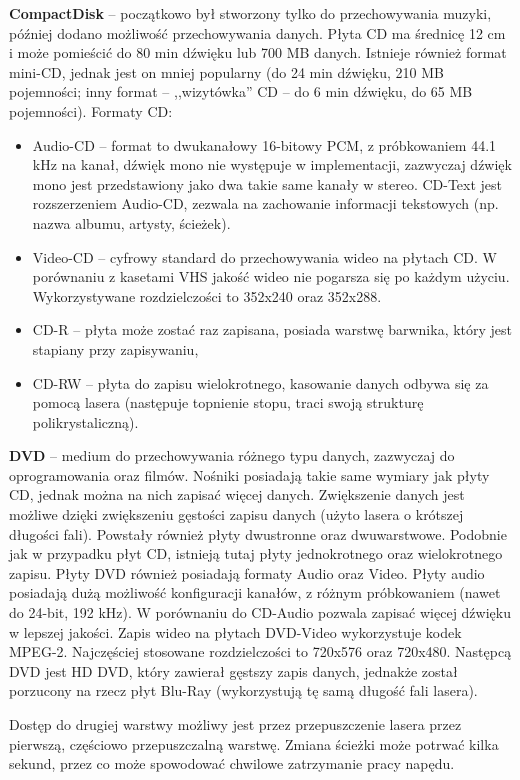 \textbf{CompactDisk} -- początkowo był stworzony tylko do przechowywania muzyki, później dodano możliwość przechowywania danych. Płyta CD ma średnicę 12 cm i może pomieścić do 80 min dźwięku lub 700 MB danych. Istnieje również format mini-CD, jednak jest on mniej popularny (do 24 min dźwięku, 210 MB pojemności; inny format -- ,,wizytówka'' CD -- do 6 min dźwięku, do 65 MB pojemności). Formaty CD:
\begin{itemize}
	\setlength\itemsep{1pt}
	\item Audio-CD -- format to dwukanałowy 16-bitowy PCM, z próbkowaniem 44.1 kHz na kanał, dźwięk mono nie występuje w implementacji, zazwyczaj dźwięk mono jest przedstawiony jako dwa takie same kanały w stereo. CD-Text jest rozszerzeniem Audio-CD, zezwala na zachowanie informacji tekstowych (np. nazwa albumu, artysty, ścieżek).
	\item Video-CD -- cyfrowy standard do przechowywania wideo na płytach CD. W porównaniu z kasetami VHS jakość wideo nie pogarsza się po każdym użyciu. Wykorzystywane rozdzielczości to 352x240 oraz 352x288.
	\item CD-R -- płyta może zostać raz zapisana, posiada warstwę barwnika, który jest stapiany przy zapisywaniu,
	\item CD-RW -- płyta do zapisu wielokrotnego, kasowanie danych odbywa się za pomocą lasera (następuje topnienie stopu, traci swoją strukturę polikrystaliczną).
\end{itemize}

\textbf{DVD} -- medium do przechowywania różnego typu danych, zazwyczaj do oprogramowania oraz filmów. Nośniki posiadają takie same wymiary jak płyty CD, jednak można na nich zapisać więcej danych. Zwiększenie danych jest możliwe dzięki zwiększeniu gęstości zapisu danych (użyto lasera o krótszej długości fali). Powstały również płyty dwustronne oraz dwuwarstwowe. Podobnie jak w przypadku płyt CD, istnieją tutaj płyty jednokrotnego oraz wielokrotnego zapisu. Płyty DVD również posiadają formaty Audio oraz Video. Płyty audio posiadają dużą możliwość konfiguracji kanałów, z różnym próbkowaniem (nawet do 24-bit, 192 kHz). W porównaniu do CD-Audio pozwala zapisać więcej dźwięku w lepszej jakości. Zapis wideo na płytach DVD-Video wykorzystuje kodek MPEG-2. Najczęściej stosowane rozdzielczości to 720x576 oraz 720x480. Następcą DVD jest HD DVD, który zawierał gęstszy zapis danych, jednakże został porzucony na rzecz płyt Blu-Ray (wykorzystują tę samą długość fali lasera).

Dostęp do drugiej warstwy możliwy jest przez przepuszczenie lasera przez pierwszą, częściowo przepuszczalną warstwę. Zmiana ścieżki może potrwać kilka sekund, przez co może spowodować chwilowe zatrzymanie pracy napędu.

